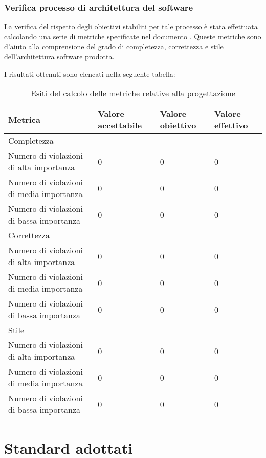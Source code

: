 		\subsubsection{Verifica processo di architettura del software}
		La verifica del rispetto degli obiettivi stabiliti per tale processo è stata effettuata calcolando una serie di metriche specificate nel documento \NdP. Queste metriche sono d'aiuto alla comprensione del grado di completezza, correttezza e stile dell'architettura software prodotta.
		
		I risultati ottenuti sono elencati nella seguente tabella:
		\begin{table}[H]
		\begin{tabular}{|l|p{2cm}|p{2cm}|p{2cm}|}
		\hline
		\textbf{Metrica} 		 					&\textbf{Valore accettabile}	&\textbf{Valore obiettivo}	&\textbf{Valore effettivo}\\
		\hline
		Completezza									&								&							&\\
		Numero di violazioni di alta importanza		&0								&0							&0\\						
		Numero di violazioni di media importanza	&0								&0							&0\\						
		Numero di violazioni di bassa importanza	&0								&0							&0\\						
		\hline
		Correttezza 								&								&							&\\
		Numero di violazioni di alta importanza		&0								&0							&0\\						
		Numero di violazioni di media importanza	&0								&0							&0\\						
		Numero di violazioni di bassa importanza	&0								&0							&0\\						
		\hline
		Stile 										&								&							&\\
		Numero di violazioni di alta importanza		&0								&0							&0\\						
		Numero di violazioni di media importanza	&0								&0							&0\\						
		Numero di violazioni di bassa importanza	&0								&0							&0\\						
		\hline
		\end{tabular}
		\caption{Esiti del calcolo delle metriche relative alla progettazione}
		\end{table}


\appendix
\section{Standard adottati}
